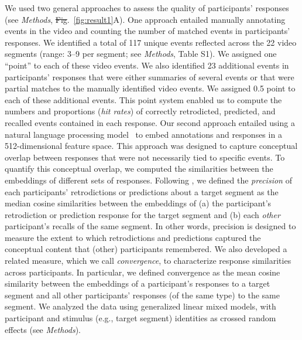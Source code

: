 \documentclass[10pt]{article}
\newcommand{\stimDescription}{S1} %
\providecommand{\DIFaddtex}[1]{{\protect\color{blue}\uwave{#1}}} %
\providecommand{\DIFdeltex}[1]{{\protect\color{red}\sout{#1}}}                      %
\providecommand{\DIFaddbegin}{} %
\providecommand{\DIFaddend}{} %
\providecommand{\DIFdelbegin}{} %
\providecommand{\DIFdelend}{} %
\providecommand{\DIFadd}[1]{\texorpdfstring{\DIFaddtex{#1}}{#1}} %
\providecommand{\DIFdel}[1]{\texorpdfstring{\DIFdeltex{#1}}{}} %
\newcommand{\DIFscaledelfig}{0.5}
\newlength{\DIFdelgraphicswidth} %
\newlength{\DIFdelgraphicsheight} %
\newcommand{\DIFaddincludegraphics}[2][]{{\color{blue}\fbox{\DIFOincludegraphics[#1]{#2}}}} %
\newcommand{\DIFdelincludegraphics}[2][]{%
\sbox{\DIFdelgraphicsbox}{\DIFOincludegraphics[#1]{#2}}%
\settoboxwidth{\DIFdelgraphicswidth}{\DIFdelgraphicsbox} %
\settoboxtotalheight{\DIFdelgraphicsheight}{\DIFdelgraphicsbox} %
\scalebox{\DIFscaledelfig}{%
\parbox[b]{\DIFdelgraphicswidth}{\usebox{\DIFdelgraphicsbox}\\[-\baselineskip] \rule{\DIFdelgraphicswidth}{0em}}\llap{\resizebox{\DIFdelgraphicswidth}{\DIFdelgraphicsheight}{%
\setlength{\unitlength}{\DIFdelgraphicswidth}%
\begin{picture}(1,1)%
\thicklines\linethickness{2pt} %
{\color[rgb]{1,0,0}\put(0,0){\framebox(1,1){}}}%
{\color[rgb]{1,0,0}\put(0,0){\line( 1,1){1}}}%
{\color[rgb]{1,0,0}\put(0,1){\line(1,-1){1}}}%
\end{picture}%
}\hspace*{3pt}}} %
} %
\DeclareRobustCommand{\DIFaddbegin}{\DIFOaddbegin \let\includegraphics\DIFaddincludegraphics} %
\DeclareRobustCommand{\DIFaddend}{\DIFOaddend \let\includegraphics\DIFOincludegraphics} %
\DeclareRobustCommand{\DIFdelbegin}{\DIFOdelbegin \let\includegraphics\DIFdelincludegraphics} %
\DeclareRobustCommand{\DIFdelend}{\DIFOaddend \let\includegraphics\DIFOincludegraphics} %
\begin{document}
We used two general approaches to assess the quality of participants' responses
(see \textit{Methods}, \DIFdelbegin \DIFdel{Fig}\DIFdelend \DIFaddbegin \DIFadd{Figs}\DIFaddend .~\ref{fig:result1}A). One approach entailed
manually annotating events in the video and counting the number of matched
events in participants' responses. We identified a total of 117 unique events
reflected across the 22 video segments \DIFaddbegin \DIFadd{in our main experiment }\DIFaddend (range: 3--9 per
segment; see \textit{Methods}, Table \stimDescription). We assigned one
``point'' to each of these video events. We also identified 23 additional
events in participants' responses that were either summaries of several events
or that were partial matches to the manually identified video events. We
assigned 0.5 point to each of these additional events. This point system
enabled us to compute the numbers and proportions (\textit{hit rates}) of
correctly retrodicted, predicted, and recalled events contained in each
response. Our second approach entailed using a natural language processing
model~\citep{CerEtal18} to embed annotations and responses in a 512-dimensional
feature space. This approach was designed to capture conceptual overlap between
responses that were not necessarily tied to specific events. To quantify this
conceptual overlap, we computed the similarities between the embeddings of
different sets of responses. Following \cite{HeusEtal21}, we defined the
\textit{precision} of each participants' retrodictions or predictions about a
target segment as the median cosine similarities between the embeddings of (a)
the participant's retrodiction or prediction response for the target segment
and (b) each \textit{other} participant's recalls of the same segment. In other
words, precision is designed to measure the extent to which retrodictions and
predictions captured the conceptual content that (other) participants
remembered. We also developed a related measure, which we call
\textit{convergence}, to characterize response similarities across
participants. In particular, we defined convergence as the mean cosine
similarity between the embeddings of a participant's responses to a target
segment and all other participants' responses (of the same type) to the same
segment. We analyzed the data using generalized linear mixed models, with
participant and stimulus (e.g., target segment) identities as crossed random
effects (see \textit{Methods}).
\end{document}
